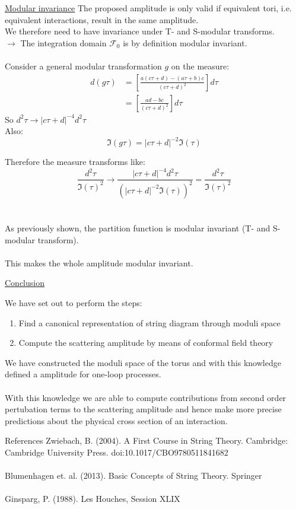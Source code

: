 \documentclass[11pt,aspectratio=169]{beamer}
\begin{document}
\begin{frame}{\underline{Modular invariance}}
	The proposed amplitude is only valid if equivalent tori, i.e. equivalent interactions, result in the same amplitude. 
	\\
	We therefore need to have invariance under T- and S-modular transforms.
	\\
	$\rightarrow$ The integration domain $\mathcal{F}_0$ is by definition modular invariant. 
	\\~\\
	Consider a general modular transformation $g$ on the measure:
	\begin{align*}
		d(g\tau) &=  [\frac{a(c\tau + d) - (a\tau + b)c}{(c\tau + d)^2}]d\tau \\
		&= [\frac{ad - bc}{(c\tau + d)^2}]d\tau
	\end{align*}
	So $d^2\tau \rightarrow |c\tau + d|^{-4}d^2\tau$
	\\
	Also: 
	\begin{equation}
		\Im(g\tau) = |c\tau + d|^{-2}\Im(\tau)
	\end{equation}
	
	
\end{frame}

\begin{frame}
	Therefore the measure transforms like:
	\begin{equation}
		\frac{d^2\tau}{\Im(\tau)^2} \rightarrow \frac{|c\tau + d|^{-4}d^2\tau}{(|c\tau + d|^{-2}\Im(\tau))^2} = \frac{d^2\tau}{\Im(\tau)^2}
	\end{equation}
	\\~\\
	As previously shown, the partition function is modular invariant (T- and S-modular transform). 
	\\~\\
	This makes the whole amplitude modular invariant.
\end{frame}

\begin{frame}{\underline{Conclusion}}

	We have set out to perform the steps:
	\begin{enumerate}
		\item Find a canonical representation of string diagram through moduli space
		\item Compute the scattering amplitude by means of conformal field theory
	\end{enumerate}
	We have constructed the moduli space of the torus and with this knowledge defined a amplitude for one-loop processes.
	\\~\\
	With this knowledge we are able to compute contributions from second order pertubation terms to the scattering amplitude and hence make more precise predictions about the physical cross section of an interaction.

	
\end{frame}

\begin{frame}{References}
	Zwiebach, B. (2004). A First Course in String Theory. Cambridge: Cambridge University Press. doi:10.1017/CBO9780511841682
	\\~\\
	Blumenhagen et. al. (2013). Basic Concepts of String Theory. Springer
	\\~\\
	Ginsparg, P. (1988). Les Houches, Session XLIX
\end{frame}
\end{document}
